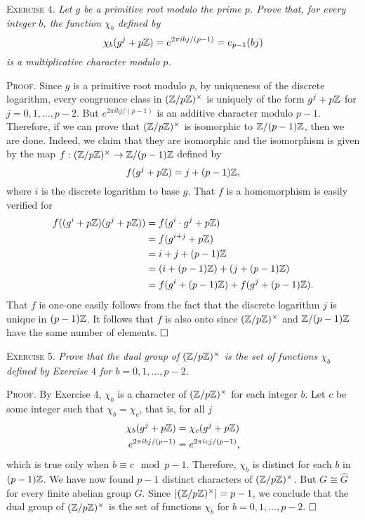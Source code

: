 \documentclass[11pt, leqno]{article}
\newcommand{\done}{\ensuremath{\hfill\square}}
\begin{document}
\textsc{Exercise 4}. \emph{Let $g$ be a primitive root modulo the prime $p$. Prove that, for every integer $b$, the function $\chi_b$ defined by 
\begin{displaymath}
\chi_b(g^j + p\mathbb{Z}) = e^{2\pi i bj / (p-1)} = e_{p-1}(bj)
\end{displaymath}
is a multiplicative character modulo $p$.}

\textsc{Proof}. Since $g$ is a primitive root modulo $p$, by uniqueness of the discrete logarithm, every congruence class in $(\mathbb{Z}/p\mathbb{Z})^{\times}$ is uniquely of the form $g^j + p\mathbb{Z}$ for $j = 0, 1, \ldots, p-2$. But $e^{2\pi i bj/(p-1)}$ is an additive character modulo $p-1$. Therefore, if we can prove that $(\mathbb{Z}/p\mathbb{Z})^{\times}$ is isomorphic to $\mathbb{Z}/(p-1)\mathbb{Z}$, then we are done. Indeed, we claim that they are isomorphic and the isomorphism is given by the map $f: (\mathbb{Z}/p\mathbb{Z})^{\times} \to \mathbb{Z}/(p-1)\mathbb{Z}$ defined by 
\begin{displaymath}
f(g^j + p\mathbb{Z}) = j + (p-1)\mathbb{Z},
\end{displaymath}
where $i$ is the discrete logarithm to base $g$. That $f$ is a homomorphism is easily verified for 
\begin{align*}
  f((g^i + p\mathbb{Z})(g^j + p\mathbb{Z})) &= f(g^i\cdot g^j + p\mathbb{Z}) \\
                            &= f(g^{i+j} + p\mathbb{Z}) \\
                            &= i+j + (p-1)\mathbb{Z} \\
                            &= (i + (p-1)\mathbb{Z}) + (j + (p-1)\mathbb{Z}) \\
                            &= f(g^i+(p-1)\mathbb{Z}) + f(g^j + (p-1)\mathbb{Z}).
\end{align*}
That $f$ is one-one easily follows from the fact that the discrete logarithm $j$ is unique in $(p-1)\mathbb{Z}$. It follows that $f$ is also onto since $(\mathbb{Z}/p\mathbb{Z})^{\times}$ and $\mathbb{Z}/(p-1)\mathbb{Z}$ have the same number of elements. \done

\textsc{Exercise 5}. \emph{Prove that the dual group of $(\mathbb{Z}/p\mathbb{Z})^{\times}$ is the set of functions $\chi_b$ defined by Exercise $4$ for $b = 0, 1, \ldots, p-2$.}

\textsc{Proof}. By Exercise $4$, $\chi_b$ is a character of $(\mathbb{Z}/p\mathbb{Z})^{\times}$ for each integer $b$. Let $c$ be some integer such that $\chi_b = \chi_c$, that is, for all $j$
\begin{align*}
  \chi_b(g^j + p\mathbb{Z}) &= \chi_c(g^j + p\mathbb{Z}) \\
  e^{2\pi i bj /(p-1)} &= e^{2\pi i cj /(p-1)},
\end{align*}
which is true only when $b \equiv c \mod p-1$. Therefore, $\chi_b$ is distinct for each $b$ in $(p-1)\mathbb{Z}$. We have now found $p-1$ distinct characters of $(\mathbb{Z}/p\mathbb{Z})^{\times}$. But $G \cong \widehat{G}$ for every finite abelian group $G$. Since $|(\mathbb{Z}/p\mathbb{Z})^{\times}| = p-1$, we conclude that the dual group of $(\mathbb{Z}/p\mathbb{Z})^{\times}$ is the set of functions $\chi_b$ for $b = 0,1,\ldots, p-2$. \done
\end{document}
